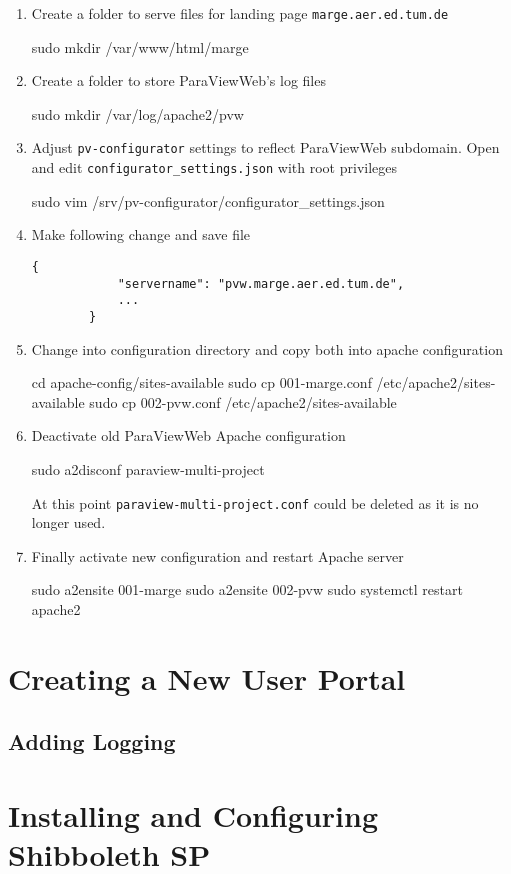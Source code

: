 \begin{enumerate}
    \item Create a folder to serve files for landing page
    \lstinline{marge.aer.ed.tum.de}
    \begin{terminal}
        sudo mkdir /var/www/html/marge
    \end{terminal}
    \item Create a folder to store ParaViewWeb's log files
    \begin{terminal}
        sudo mkdir /var/log/apache2/pvw
    \end{terminal}
    \item Adjust \lstinline{pv-configurator} settings to reflect ParaViewWeb
    subdomain. Open and edit \lstinline{configurator_settings.json} with root
    privileges
    \begin{terminal}
        sudo vim /srv/pv-configurator/configurator_settings.json
    \end{terminal}
    \item Make following change and save file
    \begin{lstlisting}[frame=single]
        {
            "servername": "pvw.marge.aer.ed.tum.de",
            ...
        }
    \end{lstlisting}
    \item Change into configuration directory and copy both into apache
    configuration
    \begin{terminal}
        cd apache-config/sites-available
        sudo cp 001-marge.conf /etc/apache2/sites-available
        sudo cp 002-pvw.conf /etc/apache2/sites-available
    \end{terminal}
    \item Deactivate old ParaViewWeb Apache configuration
    \begin{terminal}
        sudo a2disconf paraview-multi-project
    \end{terminal}
    At this point \lstinline{paraview-multi-project.conf} could be deleted as it
    is no longer used.
    \item Finally activate new configuration and restart Apache server
    \begin{terminal}
        sudo a2ensite 001-marge
        sudo a2ensite 002-pvw
        sudo systemctl restart apache2
    \end{terminal}
\end{enumerate}

\section{Creating a New User Portal}



\subsection{Adding Logging}

\section{Installing and Configuring Shibboleth SP}\label{section:shibboleth}

